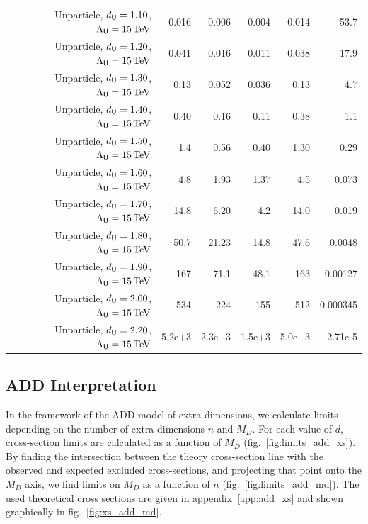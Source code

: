 \begin{table}[hbtp]
\begin{center}
{\begin{tabular}{rrrrrr}
Unparticle, $d_{\textsf{U}}=1.10$, $\Lambda_{\textsf{U}}=15\,\text{Te\hspace{-.08em}V}$ &   0.016 &    0.006 &    0.004 &    0.014 & 53.7 \\
Unparticle, $d_{\textsf{U}}=1.20$, $\Lambda_{\textsf{U}}=15\,\text{Te\hspace{-.08em}V}$ &   0.041 &    0.016 &    0.011 &    0.038 & 17.9 \\
Unparticle, $d_{\textsf{U}}=1.30$, $\Lambda_{\textsf{U}}=15\,\text{Te\hspace{-.08em}V}$ &    0.13 &    0.052 &    0.036 &    0.13  &  4.7 \\
Unparticle, $d_{\textsf{U}}=1.40$, $\Lambda_{\textsf{U}}=15\,\text{Te\hspace{-.08em}V}$ &    0.40 &     0.16 &     0.11 &    0.38  &  1.1 \\
Unparticle, $d_{\textsf{U}}=1.50$, $\Lambda_{\textsf{U}}=15\,\text{Te\hspace{-.08em}V}$ &     1.4 &     0.56 &     0.40 &    1.30  &  0.29 \\
Unparticle, $d_{\textsf{U}}=1.60$, $\Lambda_{\textsf{U}}=15\,\text{Te\hspace{-.08em}V}$ &     4.8 &     1.93 &     1.37 &    4.5   &  0.073 \\
Unparticle, $d_{\textsf{U}}=1.70$, $\Lambda_{\textsf{U}}=15\,\text{Te\hspace{-.08em}V}$ &    14.8 &     6.20 &      4.2 &   14.0   &  0.019 \\
Unparticle, $d_{\textsf{U}}=1.80$, $\Lambda_{\textsf{U}}=15\,\text{Te\hspace{-.08em}V}$ &    50.7 &    21.23 &     14.8 &   47.6   &  0.0048 \\
Unparticle, $d_{\textsf{U}}=1.90$, $\Lambda_{\textsf{U}}=15\,\text{Te\hspace{-.08em}V}$ &     167 &     71.1 &     48.1 &  163     &  0.00127 \\
Unparticle, $d_{\textsf{U}}=2.00$, $\Lambda_{\textsf{U}}=15\,\text{Te\hspace{-.08em}V}$ &     534 &      224 &      155 &  512     &  0.000345 \\
Unparticle, $d_{\textsf{U}}=2.20$, $\Lambda_{\textsf{U}}=15\,\text{Te\hspace{-.08em}V}$ &  5.2e+3 &   2.3e+3 &   1.5e+3 & 5.0e+3   &  2.71e-5 \\\hline
  \end{tabular}
}
  \end{center}
\end{table}



\clearpage

 \subsection{ADD Interpretation}
In the framework of the ADD model of extra dimensions, we calculate limits depending on the number of extra dimensions $n$ and $M_{D}$.
For each value of $d$, cross-section limits are calculated as a function of $M_{D}$ (fig.~\ref{fig:limits_add_xs}).
By finding the intersection between the theory cross-section line with the observed and expected excluded cross-sections,
and projecting that point onto the $M_{D}$ axis, we find limits on $M_{D}$ as a function of $n$ (fig.~\ref{fig:limits_add_md}).
The used theoretical cross sections are given in appendix~\ref{app:add_xs} and shown graphically in fig.~\ref{fig:xs_add_md}.

